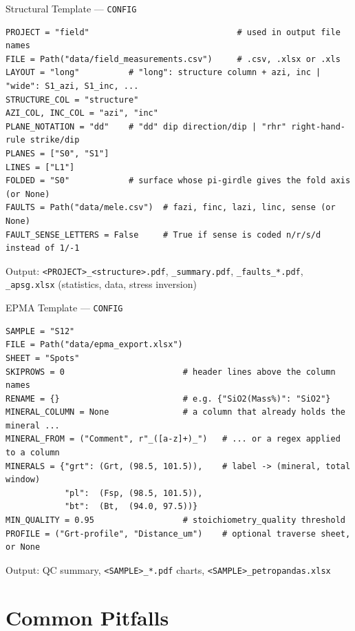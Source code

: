\documentclass[aspectratio=169,11pt]{beamer}
\begin{document}
\begin{frame}[fragile]{Structural Template --- \texttt{CONFIG}}
  \begin{lstlisting}[style=python]
PROJECT = "field"                              # used in output file names
FILE = Path("data/field_measurements.csv")     # .csv, .xlsx or .xls
LAYOUT = "long"          # "long": structure column + azi, inc | "wide": S1_azi, S1_inc, ...
STRUCTURE_COL = "structure"
AZI_COL, INC_COL = "azi", "inc"
PLANE_NOTATION = "dd"    # "dd" dip direction/dip | "rhr" right-hand-rule strike/dip
PLANES = ["S0", "S1"]
LINES = ["L1"]
FOLDED = "S0"            # surface whose pi-girdle gives the fold axis (or None)
FAULTS = Path("data/mele.csv")  # fazi, finc, lazi, linc, sense (or None)
FAULT_SENSE_LETTERS = False     # True if sense is coded n/r/s/d instead of 1/-1
  \end{lstlisting}
  \small Output: \texttt{<PROJECT>\_<structure>.pdf}, \texttt{\_summary.pdf},
  \texttt{\_faults\_*.pdf}, \texttt{\_apsg.xlsx} (statistics, data, stress inversion)
\end{frame}

\begin{frame}[fragile]{EPMA Template --- \texttt{CONFIG}}
  \begin{lstlisting}[style=python]
SAMPLE = "S12"
FILE = Path("data/epma_export.xlsx")
SHEET = "Spots"
SKIPROWS = 0                        # header lines above the column names
RENAME = {}                         # e.g. {"SiO2(Mass%)": "SiO2"}
MINERAL_COLUMN = None               # a column that already holds the mineral ...
MINERAL_FROM = ("Comment", r"_([a-z]+)_")   # ... or a regex applied to a column
MINERALS = {"grt": (Grt, (98.5, 101.5)),    # label -> (mineral, total window)
            "pl":  (Fsp, (98.5, 101.5)),
            "bt":  (Bt,  (94.0, 97.5))}
MIN_QUALITY = 0.95                  # stoichiometry_quality threshold
PROFILE = ("Grt-profile", "Distance_um")    # optional traverse sheet, or None
  \end{lstlisting}
  \small Output: QC summary, \texttt{<SAMPLE>\_*.pdf} charts, \texttt{<SAMPLE>\_petropandas.xlsx}
\end{frame}

\section{Common Pitfalls}
\end{document}
